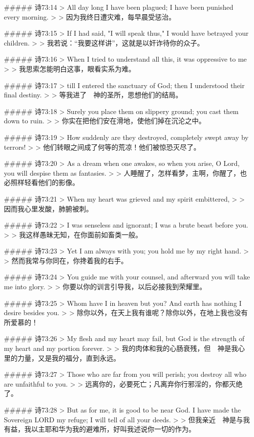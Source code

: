 ##### 诗73:14
> All day long I have been plagued; I have been punished every morning.
>
> 因为我终日遭灾难，每早晨受惩治。


##### 诗73:15
> If I had said, "I will speak thus," I would have betrayed your children.
>
> 我若说：“我要这样讲”，这就是以奸诈待你的众子。


##### 诗73:16
> When I tried to understand all this, it was oppressive to me
>
> 我思索怎能明白这事，眼看实系为难。


##### 诗73:17
> till I entered the sanctuary of God; then I understood their final destiny.
>
> 等我进了　神的圣所，思想他们的结局。


##### 诗73:18
> Surely you place them on slippery ground; you cast them down to ruin.
>
> 你实在把他们安在滑地，使他们掉在沉沦之中。


##### 诗73:19
> How suddenly are they destroyed, completely swept away by terrors!
>
> 他们转眼之间成了何等的荒凉！他们被惊恐灭尽了。


##### 诗73:20
> As a dream when one awakes, so when you arise, O Lord, you will despise them as fantasies.
>
> 人睡醒了，怎样看梦，主啊，你醒了，也必照样轻看他们的影像。


##### 诗73:21
> When my heart was grieved and my spirit embittered,
>
> 因而我心里发酸，肺腑被刺。


##### 诗73:22
> I was senseless and ignorant; I was a brute beast before you.
>
> 我这样愚昧无知，在你面前如畜类一般。


##### 诗73:23
> Yet I am always with you; you hold me by my right hand.
>
> 然而我常与你同在，你搀着我的右手。


##### 诗73:24
> You guide me with your counsel, and afterward you will take me into glory.
>
> 你要以你的训言引导我，以后必接我到荣耀里。


##### 诗73:25
> Whom have I in heaven but you? And earth has nothing I desire besides you.
>
> 除你以外，在天上我有谁呢？除你以外，在地上我也没有所爱慕的！


##### 诗73:26
> My flesh and my heart may fail, but God is the strength of my heart and my portion forever.
>
> 我的肉体和我的心肠衰残，但　神是我心里的力量，又是我的福分，直到永远。


##### 诗73:27
> Those who are far from you will perish; you destroy all who are unfaithful to you.
>
> 远离你的，必要死亡；凡离弃你行邪淫的，你都灭绝了。


##### 诗73:28
> But as for me, it is good to be near God. I have made the Sovereign LORD my refuge; I will tell of all your deeds.
>
> 但我亲近　神是与我有益，我以主耶和华为我的避难所，好叫我述说你一切的作为。


